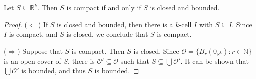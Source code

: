 \begin{theorem}
  Let $S \subseteq \mathbb{R}^k$.
  Then $S$ is compact if and only if $S$ is closed and bounded.
\end{theorem}
\begin{proof}
  ($\Leftarrow$)
  If $S$ is closed and bounded, then there is a $k$-cell $I$ with $S \subseteq
  I$.
  Since $I$ is compact, and $S$ is closed, we conclude that $S$ is compact.

  ($\Rightarrow$)
  Suppose that $S$ is compact.
  Then $S$ is closed.
  Since $\mathcal{O} = \{B_r(0_{\mathbb{R}^k}): r \in \mathbb{N}\}$ is an open
  cover of $S$, there is $\mathcal{O}' \subseteq \mathcal{O}$ such that $S
  \subseteq \bigcup \mathcal{O}'$.
  It can be shown that $\bigcup \mathcal{O}'$ is bounded, and thus $S$ is
  bounded.
\end{proof}